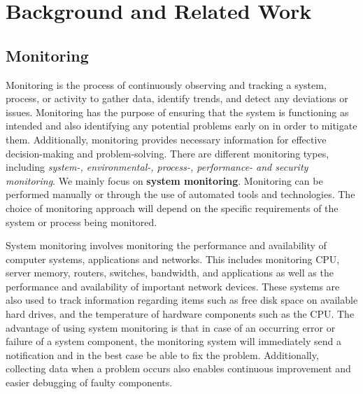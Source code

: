 \chapter{Background and Related Work}
\label{ch:background}

    \section{Monitoring}
    \label{sec:monitoring-background}

        Monitoring is the process of continuously observing and tracking a system, process, or activity to gather data, identify trends, and detect any deviations or issues.
        Monitoring has the purpose of ensuring that the system is functioning as intended and also identifying any potential problems early on in order to mitigate them. Additionally, monitoring provides necessary information for effective decision-making and problem-solving.
        There are different monitoring types, including \emph{system-, environmental-, process-, performance- and security monitoring}.
        We mainly focus on \textbf{system monitoring}.
        Monitoring can be performed manually or through the use of automated tools and technologies.
        The choice of monitoring approach will depend on the specific requirements of the system or process being monitored.

        System monitoring involves monitoring the performance and availability of computer systems, applications and networks.
        This includes monitoring CPU, server memory, routers, switches, bandwidth, and applications as well as the performance and availability of important network devices. 
        These systems are also used to track information regarding items such as free disk space on available hard drives, and the temperature of hardware components such as the CPU.
        The advantage of using system monitoring is that in case of an occurring error or failure of a system component, the monitoring system will immediately send a notification and in the best case be able to fix the problem.
        Additionally, collecting data when a problem occurs also enables continuous improvement and easier debugging of faulty components.




